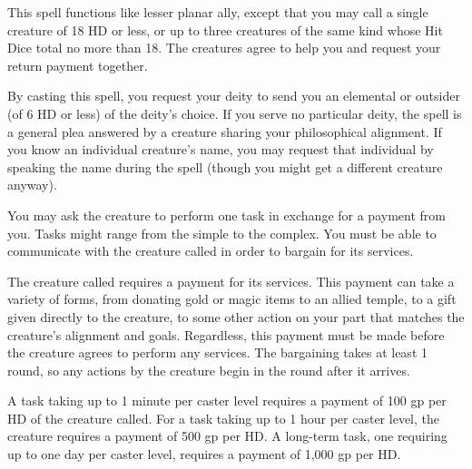 \begin{multicols}{2}
\begin{small}
\noindent This spell functions like lesser planar ally, except that you may call a single creature of 18 HD or less, or up to three creatures of the same kind whose Hit Dice total no more than 18. The creatures agree to help you and request your return payment together.


\noindent By casting this spell, you request your deity to send you an elemental or outsider (of 6 HD or less) of the deity's choice. If you serve no particular deity, the spell is a general plea answered by a creature sharing your philosophical alignment. If you know an individual creature's name, you may request that individual by speaking the name during the spell (though you might get a different creature anyway).

\smallskip\noindent You may ask the creature to perform one task in exchange for a payment from you. Tasks might range from the simple to the complex. You must be able to communicate with the creature called in order to bargain for its services.

\smallskip\noindent The creature called requires a payment for its services. This payment can take a variety of forms, from donating gold or magic items to an allied temple, to a gift given directly to the creature, to some other action on your part that matches the creature's alignment and goals. Regardless, this payment must be made before the creature agrees to perform any services. The bargaining takes at least 1 round, so any actions by the creature begin in the round after it arrives.

\smallskip\noindent A task taking up to 1 minute per caster level requires a payment of 100 gp per HD of the creature called. For a task taking up to 1 hour per caster level, the creature requires a payment of 500 gp per HD. A long-term task, one requiring up to one day per caster level, requires a payment of 1,000 gp per HD.


\end{small}
\end{multicols}
